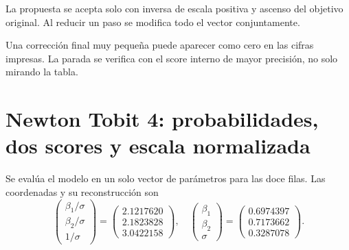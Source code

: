 \documentclass[11pt,a4paper]{article}
\begin{document}
La propuesta se acepta solo con
inversa de escala positiva
y ascenso del objetivo original.
Al reducir un paso se modifica
todo el vector conjuntamente.

Una corrección final muy pequeña
puede aparecer como cero
en las cifras impresas.
La parada se verifica con
el score interno de mayor precisión,
no solo mirando la tabla.

\clearpage
\section{Newton Tobit 4: probabilidades, dos scores y escala normalizada}\label{unidad110}
Se evalúa el modelo en un solo vector
de parámetros para las doce filas.
Las coordenadas y su reconstrucción son
\[
\begin{pmatrix}\beta_1/\sigma\\\beta_2/\sigma\\1/\sigma\end{pmatrix}=\begin{pmatrix}2.1217620\\2.1823828\\3.0422158\end{pmatrix},\quad\begin{pmatrix}\beta_1\\\beta_2\\\sigma\end{pmatrix}=\begin{pmatrix}0.6974397\\0.7173662\\0.3287078\end{pmatrix}.
\]
\end{document}
